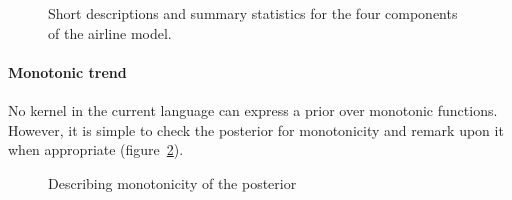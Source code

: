 \documentclass{article}
\begin{document}
\begin{figure}[h]
\centering
{}
\caption{
Short descriptions and summary statistics for the four components of the airline model.}
\label{fig:exec-airline}
\end{figure}

\paragraph{Monotonic trend}

No kernel in the current language can express a prior over monotonic functions.
However, it is simple to check the posterior for monotonicity and remark upon it when appropriate (figure~\ref{fig:monotonic}).

\begin{figure}[h]
\centering
{}
\caption{Describing monotonicity of the posterior}
\label{fig:monotonic}
\end{figure}
\end{document}
